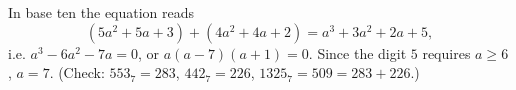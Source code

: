 In base ten the equation reads
\[\left(5a^2+5a+3\right)+\left(4a^2+4a+2\right)=a^3+3a^2+2a+5,\]
i.e. $a^3-6a^2-7a=0$, or $a(a-7)(a+1)=0$. Since the digit $5$ requires $a\ge6$, $a=\boxed{7}$. (Check: $553_7=283$, $442_7=226$, $1325_7=509=283+226$.)
